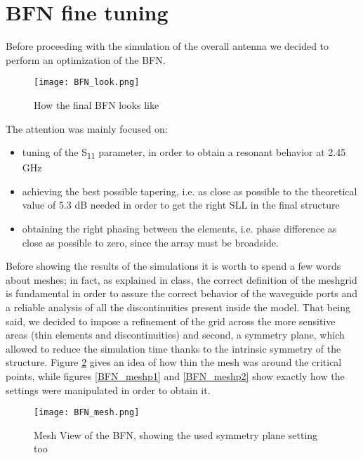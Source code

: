 \section{BFN fine tuning}

Before proceeding with the simulation of the overall antenna we decided to perform an optimization of the BFN.

\begin{figure}[H]
\centering
\texttt{[image: BFN\_look.png]}
\caption{How the final BFN looks like}
\label{BFN_look}
\end{figure}

\par\medskip
\noindent
The attention was mainly focused on:

\begin{itemize}
\item tuning of the S\textsubscript{11} parameter, in order to obtain a resonant behavior at 2.45 GHz
\item achieving the best possible tapering, i.e. as close as possible to the theoretical value of 5.3 dB needed in order to get the right SLL in the final structure
\item obtaining the right phasing between the elements, i.e. phase difference as close as possible to zero, since the array must be broadside.
\end{itemize}

\par\medskip
\noindent
Before showing the results of the simulations it is worth to spend a few words about meshes; in fact, as explained in class, the correct definition of the meshgrid is fundamental in order to assure the correct behavior of the waveguide ports and a reliable analysis of all the discontinuities present inside the model. That being said, we decided to impose a refinement of the grid across the more sensitive areas (thin elements and discontinuities) and second, a symmetry plane, which allowed to reduce the simulation time thanks to the intrinsic symmetry of the structure.
\noindent
Figure \ref{BFN_mesh} gives an idea of how thin the mesh was around the critical points, while figures \ref{BFN_meshp1} and \ref{BFN_meshp2} show exactly how the settings were manipulated in order to obtain it.

\begin{figure}[H]
\centering
\texttt{[image: BFN\_mesh.png]}
\caption{Mesh View of the BFN, showing the used symmetry plane setting too}
\label{BFN_mesh}
\end{figure}


